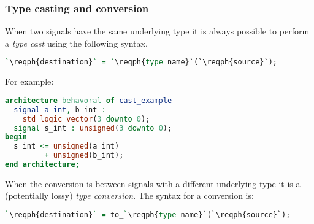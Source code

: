 \subsubsection{Type casting and conversion}
When two signals have the same underlying type it is always possible to perform
a \emph{type cast} using the following syntax.
\begin{lstlisting}[language=vhdl]
`\reqph{destination}` = `\reqph{type name}`(`\reqph{source}`);
\end{lstlisting}
For example:
\begin{lstlisting}[language=vhdl]
architecture behavoral of cast_example
  signal a_int, b_int : 
    std_logic_vector(3 downto 0);
  signal s_int : unsigned(3 downto 0);
begin
  s_int <= unsigned(a_int) 
         + unsigned(b_int);
end architecture;
\end{lstlisting}
When the conversion is between signals with a different underlying type it is a
(potentially lossy) \emph{type conversion}. The syntax for a conversion is:
\begin{lstlisting}[language=vhdl]
`\reqph{destination}` = to_`\reqph{type name}`(`\reqph{source}`);
\end{lstlisting}
